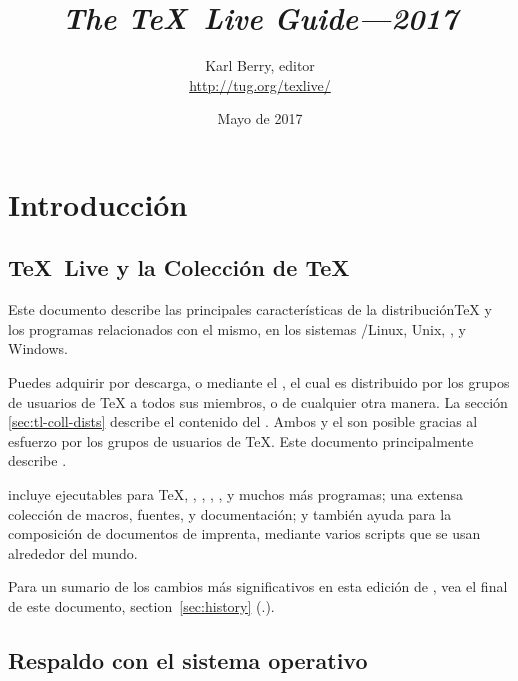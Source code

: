 \documentclass{article}
\begin{document}
\title{%
{\huge \textit{The \TeX\ Live Guide---2017}}}

\author{Karl Berry, editor \\[3mm]
        \url{http://tug.org/texlive/}}

\date{Mayo de 2017}

\maketitle

\begin{multicols}{2}
\tableofcontents
\end{multicols}



\section{Introducción}
\label{sec:intro}

\subsection{\TeX\ Live y la Colección de \TeX\ }


Este documento describe las principales características de la
distribución\Dash \TeX{} y los programas relacionados con el mismo, en
los sistemas \GNU/Linux, Unix, \MacOSX, y Windows.

Puedes adquirir \TL{} por descarga, o mediante el \TK{} \DVD, el
cual es distribuido por los grupos de usuarios de \TeX{} a todos sus
miembros, o de cualquier otra manera. La sección
\ref{sec:tl-coll-dists} describe el contenido del \DVD. Ambos \TL{} y
el \TK{} son posible gracias al esfuerzo por los grupos de usuarios de
\TeX{}. Este documento principalmente describe \TL{}.

\TL{} incluye ejecutables para \TeX{}, \LaTeXe{}, \ConTeXt, \MF, \MP,
\BibTeX{} y muchos más programas; una extensa colección de macros,
fuentes, y documentación; y también ayuda para la composición de
documentos de imprenta, mediante varios scripts que se usan alrededor
del mundo.

Para un sumario de los cambios más significativos en esta edición de
\TL{}, vea el final de este documento, section~\ref{sec:history}
(\p.\pageref{sec:history}).

\subsection{Respaldo con el sistema operativo}
\label{sec:os-support}
\end{document}
